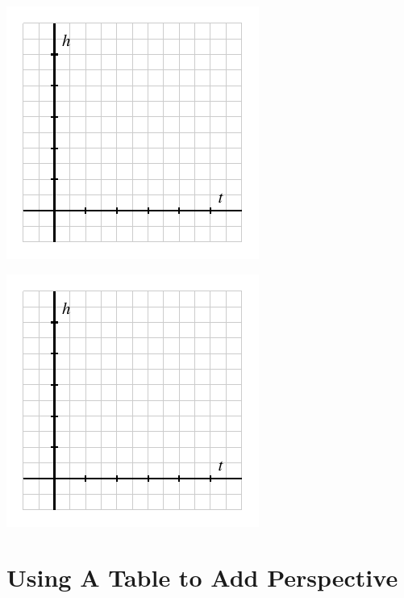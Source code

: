 \documentclass{ximera}
\begin{document}
\begin{exploration}
\begin{enumerate}[label=\alph*.]
\begin{image}
\includegraphics{tandem-h-t-blank-axes.pdf}
\end{image}


\begin{image}
\includegraphics{tandem-h-t-blank-axes.pdf}
\end{image}

\end{enumerate}
\end{exploration}




\section{Using A Table to Add Perspective}
\end{document}

